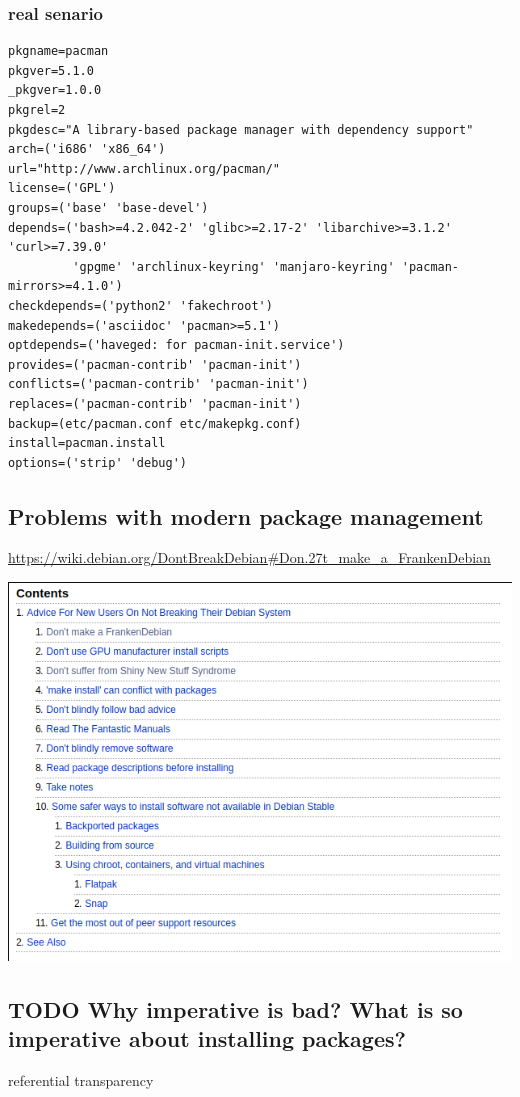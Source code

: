 \documentclass[11pt]{article}
\begin{document}
\subsubsection{real senario}
\label{sec:org5b2ff49}
\begin{verbatim}
pkgname=pacman
pkgver=5.1.0
_pkgver=1.0.0
pkgrel=2
pkgdesc="A library-based package manager with dependency support"
arch=('i686' 'x86_64')
url="http://www.archlinux.org/pacman/"
license=('GPL')
groups=('base' 'base-devel')
depends=('bash>=4.2.042-2' 'glibc>=2.17-2' 'libarchive>=3.1.2' 'curl>=7.39.0'
         'gpgme' 'archlinux-keyring' 'manjaro-keyring' 'pacman-mirrors>=4.1.0')
checkdepends=('python2' 'fakechroot')
makedepends=('asciidoc' 'pacman>=5.1')
optdepends=('haveged: for pacman-init.service')
provides=('pacman-contrib' 'pacman-init')
conflicts=('pacman-contrib' 'pacman-init')
replaces=('pacman-contrib' 'pacman-init')
backup=(etc/pacman.conf etc/makepkg.conf)
install=pacman.install
options=('strip' 'debug')
\end{verbatim}
\subsection{Problems with modern package management}
\label{sec:orgb21001e}
\url{https://wiki.debian.org/DontBreakDebian\#Don.27t\_make\_a\_FrankenDebian}
\begin{center}
\includegraphics[width=.9\linewidth]{./images/screenshot-01.png}
\end{center}
\subsection{{\bfseries\sffamily TODO} Why imperative is bad? What is so imperative about installing packages?}
\label{sec:orgf1a56e9}
referential transparency
\end{document}
